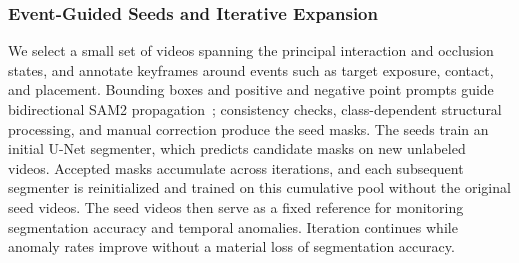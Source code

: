 \subsubsection{Event-Guided Seeds and Iterative Expansion}
We select a small set of videos spanning the principal interaction and occlusion states, and annotate keyframes around events such as target exposure, contact, and placement.
Bounding boxes and positive and negative point prompts guide bidirectional SAM2 propagation~\cite{ravi2024sam2}; consistency checks, class-dependent structural processing, and manual correction produce the seed masks.
The seeds train an initial U-Net segmenter, which predicts candidate masks on new unlabeled videos.
Accepted masks accumulate across iterations, and each subsequent segmenter is reinitialized and trained on this cumulative pool without the original seed videos.
The seed videos then serve as a fixed reference for monitoring segmentation accuracy and temporal anomalies.
Iteration continues while anomaly rates improve without a material loss of segmentation accuracy.

